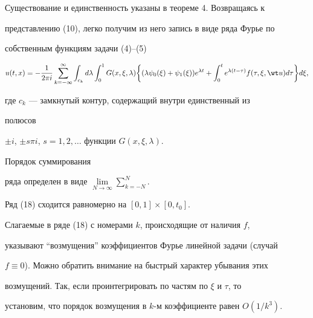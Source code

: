 \begin{pf} 


Существование и единственность указаны в теореме 4. Возвращаясь к 


представлению (10), легко получим из него запись в виде ряда Фурье по 


собственным функциям задачи (4)--(5) 


\begin{equation} 


u(t,x)=-\frac{1}{2\pi i}\sum^\infty_{k=-\infty}\int_{c_k} 


d\lambda\int^1_0


G(x,\xi,\lambda)\bigg\{(\lambda\psi_0(\xi)+ 


\psi_1(\xi))e^{\lambda t}+\int^t_0 


e^{\lambda(t-\tau)}f(\tau,\xi,\wt u)d\tau\bigg\}d\xi, 


\end{equation} 


где $c_k$ --- замкнутый контур, содержащий внутри единственный из 


полюсов 


$\pm i$, $\pm s\pi i$, $s=1,2,\dotsc$ функции $G(x,\xi,\lambda)$. 


Порядок суммирования 


ряда определен в виде $\lim\limits_{N\to\infty}\sum\limits^N_{k=-N}$. 


Ряд (18) сходится равномерно на $[0,1]\times[0,t_0]$. 


\end{pf} 


 


\begin{note} 


Слагаемые в ряде (18) с номерами $k$, происходящие от наличия $f$, 


указывают ``возмущения'' коэффициентов Фурье линейной задачи (случай 


$f\equiv 0$). Можно обратить внимание на быстрый характер убывания этих 


возмущений. Так, если проинтегрировать по частям по $\xi$ и $\tau$, то 


установим, что порядок возмущения в $k$-м коэффициенте равен $O(1/k^3)$. 


\end{note} 


 


